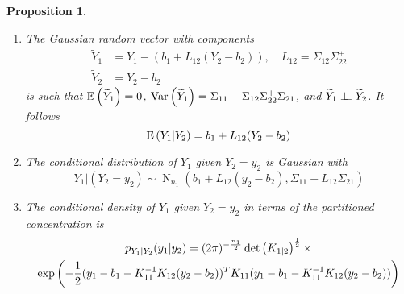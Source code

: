 \documentclass[12pt,a4paper]{amsart}
\newcommand{\gaussian}[3]{\operatorname{N}_{#1}\left(#2,#3\right)}
\theoremstyle{plain}%
\newtheorem{proposition}[thm]{Proposition}
\theoremstyle{definition}
\theoremstyle{remark}
\begin{document}
\begin{proposition}\label{prop:gauss-conditioning}\ 
  \begin{enumerate}
\item \label{item:gauss-conditioning1}
%
The Gaussian random vector with components
%
  \begin{align*}
     \widetilde Y_1 &= Y_1 - \left(b_1 + L_{12}(Y_2 - b_2)\right), \quad L_{12} = \Sigma_{12}\Sigma_{22}^+ \\
\widetilde Y_2 &= Y_2 - b_2 
  \end{align*}
%
is such that $\operatorname{\mathbb E}\left(\widetilde Y_1\right) = 0$, $\operatorname{Var}\left(\widetilde Y_1\right) = \Sigma_{11} - \Sigma_{12}\Sigma_{22}^+\Sigma_{21}$, and $\widetilde Y_1 \perp\!\!\!\perp \widetilde Y_2$.
It follows
%
\begin{equation*}
  \operatorname{E}\left(Y_1 \middle| Y_2\right) = b_1 + L_{12}(Y_2 - b_2)
\end{equation*}
  \item \label{item:gauss-conditioning2}
The conditional distribution of $Y_1$ given $Y_2=y_2$ is Gaussian with %
  \begin{equation*}
  Y_1 | (Y_2 = y_2) \sim \gaussian {n_1}{b_1 + L_{12}(y_2-b_2)}{\Sigma_{11}-L_{12}\Sigma_{21}}
  \end{equation*}
\item \label{item:gauss-conditioning3} The conditional density of $Y_1$ given $Y_2 = y_2$ in terms of the partitioned concentration is 
%
  \begin{multline*}
    p_{Y_1|Y_2}(y_1|y_2) = (2\pi)^{-\frac{n_1}2} \operatorname{det}\left(K_{1|2}\right)^{\frac12} \times \\ \exp\left(-\frac12 (y_1 - b_1 - K_{11}^{-1}K_{12} (y_2-b_2))^T K_{11} (y_1 - b_1 - K_{11}^{-1} K_{12}(y_2-b_2))\right)
  \end{multline*}
  \end{enumerate}
\end{proposition}
\end{document}

